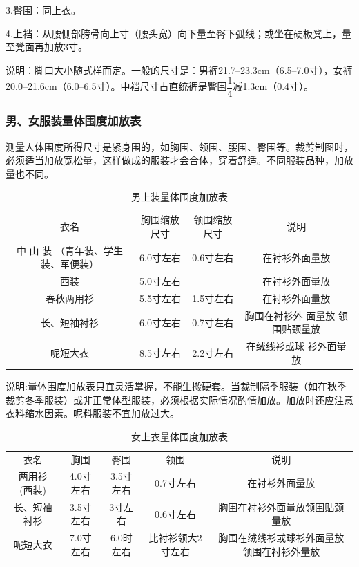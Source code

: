 \documentclass{ctexbook}
\begin{document}
3.臀围：同上衣。

4.上裆：从腰侧部胯骨向上寸（腰头宽）向下量至臀下弧线；或坐在硬板凳上，量至凳面再加放3寸。

说明：脚口大小随式样而定。一般的尺寸是：男裤21.7--23.3cm（6.5--7.0寸），女裤20.0--21.6cm（6.0--6.5寸）。中裆尺寸占直统裤是臀围$\dfrac{1}{4}$减1.3cm（0.4寸）。
\subsubsection{男、女服装量体围度加放表}
测量人体围度所得尺寸是紧身围的，如胸围、领围、腰围、臀围等。裁剪制图时，必须适当加放宽松量，这样做成的服装才会合体，穿着舒适。不同服装品种，加放量也不同。
\begin{table}[htbp]
	\centering
	\caption{男上装量体围度加放表}
	\begin{tabular}{cccc}
		衣名    & 胸围缩放尺寸 & 领围缩放尺寸 & 说明 \\
		中 山 装 （青年装、学生 装、军便装） & 6.0寸左右 & 0.6寸左右 & 在衬衫外面量放 \\
		西装    & 5.0寸左右 &       & 在衬衫外面量放 \\
		春秋两用衫 & 5.5寸左右 & 1.5寸左右 & 在衬衫外面量放 \\
		长、短袖衬衫 & 6.0寸左右 & 0.7寸左右 & 胸围在衬衫外 面量放 领围贴颈量放 \\
		呢短大衣  & 8.5寸左右 & 2.2寸左右 & 在绒线衫或球 衫外面量放 \\
	\end{tabular}%
	\label{tab:suofang}%
\end{table}%
说明:量体围度加放表只宜灵活掌握，不能生搬硬套。当裁制隔季服装（如在秋季裁剪冬季服装）或非正常体型服装，必须根据实际情况酌情加放。加放时还应注意衣料缩水因素。呢料服装不宜加放过大。
\begin{table}[htbp]
	\centering
	\caption{女上衣量体围度加放表}
	\begin{tabular}{ccccc}
		衣名    & 胸围    & 臀围    & 领围    & 说明 \\
		两用衫 (西装) & 4.0寸左右 & 3.5寸左右 & 0.7寸左右 & 在衬衫外面量放 \\
		长、短袖衬衫 & 3.5寸左右 & 3寸左右  & 0.6寸左右 & 胸围在衬衫外面量放领围贴颈量放 \\
		呢短大衣  & 7.0寸左右 & 6.0时左右 & 比衬衫领大2寸左右 & 胸围在绒线衫或球衫外面量放领围在衬衫外量放 \\
	\end{tabular}%
	\label{tab:nvshangyi}%
\end{table}%
\end{document}
